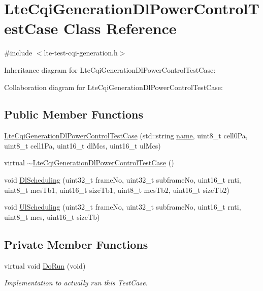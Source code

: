 \hypertarget{classLteCqiGenerationDlPowerControlTestCase}{}\section{Lte\+Cqi\+Generation\+Dl\+Power\+Control\+Test\+Case Class Reference}
\label{classLteCqiGenerationDlPowerControlTestCase}


{\ttfamily \#include $<$lte-\/test-\/cqi-\/generation.\+h$>$}



Inheritance diagram for Lte\+Cqi\+Generation\+Dl\+Power\+Control\+Test\+Case\+:


Collaboration diagram for Lte\+Cqi\+Generation\+Dl\+Power\+Control\+Test\+Case\+:
\subsection*{Public Member Functions}
\begin{DoxyCompactItemize}
\item 
\hyperlink{classLteCqiGenerationDlPowerControlTestCase_a5b9685ad054d7d4879719947f4adae42}{Lte\+Cqi\+Generation\+Dl\+Power\+Control\+Test\+Case} (std\+::string \hyperlink{generate__test__data__lte__spectrum__model_8m_ab74e6bf80237ddc4109968cedc58c151}{name}, uint8\+\_\+t cell0\+Pa, uint8\+\_\+t cell1\+Pa, uint16\+\_\+t dl\+Mcs, uint16\+\_\+t ul\+Mcs)
\item 
virtual \hyperlink{classLteCqiGenerationDlPowerControlTestCase_a1e2215658587ff382a5c027da95efc1c}{$\sim$\+Lte\+Cqi\+Generation\+Dl\+Power\+Control\+Test\+Case} ()
\item 
void \hyperlink{classLteCqiGenerationDlPowerControlTestCase_a82b6b089298691f5c00337fec4739f0f}{Dl\+Scheduling} (uint32\+\_\+t frame\+No, uint32\+\_\+t subframe\+No, uint16\+\_\+t rnti, uint8\+\_\+t mcs\+Tb1, uint16\+\_\+t size\+Tb1, uint8\+\_\+t mcs\+Tb2, uint16\+\_\+t size\+Tb2)
\item 
void \hyperlink{classLteCqiGenerationDlPowerControlTestCase_a9fc28996f508c2d1f3c00877337bb2fb}{Ul\+Scheduling} (uint32\+\_\+t frame\+No, uint32\+\_\+t subframe\+No, uint16\+\_\+t rnti, uint8\+\_\+t mcs, uint16\+\_\+t size\+Tb)
\end{DoxyCompactItemize}
\subsection*{Private Member Functions}
\begin{DoxyCompactItemize}
\item 
virtual void \hyperlink{classLteCqiGenerationDlPowerControlTestCase_a8a6ba5e52123fc8ed0deb9014a8b0591}{Do\+Run} (void)
\begin{DoxyCompactList}\small\item\em Implementation to actually run this Test\+Case. \end{DoxyCompactList}\end{DoxyCompactItemize}
